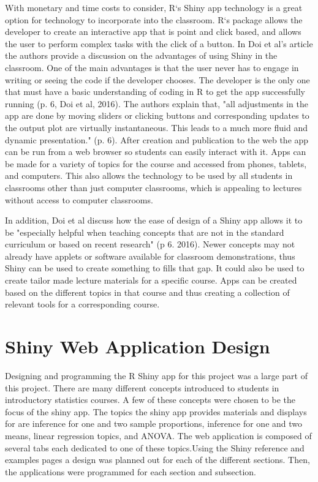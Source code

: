 \documentclass[11pt]{book}
\begin{document}
 With monetary and time costs to consider, R`s Shiny app technology is a great option for technology to incorporate into the classroom.  R`s package allows the developer to create an interactive app that is point and click based, and allows the user to perform complex tasks with the click of a button.  In Doi et al's article the authors provide a discussion on the advantages of using Shiny in the classroom. One of the main advantages is that the user never has to engage in writing or seeing the code if the developer chooses.  The developer is the only one that must have a basic understanding of coding in R to get the app successfully running (p. 6, Doi et al, 2016).
 The authors explain that, "all adjustments in the app are done by moving sliders or clicking buttons and corresponding updates to the output plot are virtually instantaneous. This leads to a much more fluid and dynamic presentation." (p. 6). After creation and publication to the web the app can be run from a web browser so students can easily interact with it.  Apps can be made for a variety of topics for the course and accessed from phones, tablets, and computers.  This also allows the technology to be used by all students in classrooms other than just computer classrooms, which is appealing to lectures without access to computer classrooms.

 In addition, Doi et al discuss how the ease of design of a Shiny app allows it to be "especially helpful when teaching concepts that are not in the standard curriculum or based on recent research" (p 6. 2016).  Newer concepts may not already have applets or software available for classroom demonstrations, thus Shiny can be used to create something to fills that gap.  It could also be used to create tailor made lecture materials for a specific course.  Apps can be created based on the different topics in that course and thus creating a collection of relevant tools for a corresponding course. 
 
 

\section{Shiny Web Application Design}
Designing and programming the R Shiny app for this project was a large part of this project. There are many different concepts introduced to students in introductory statistics courses.  A few of these concepts were chosen to be the focus of the shiny app.  The topics the shiny app provides materials and displays for are inference for one and two sample proportions, inference for one and two means, linear regression topics, and ANOVA.  The web application is composed of several tabs each dedicated to one of these topics.Using the Shiny reference and examples pages a design was planned out for each of the different sections. Then, the applications were programmed for each section and subsection. 
\end{document}
